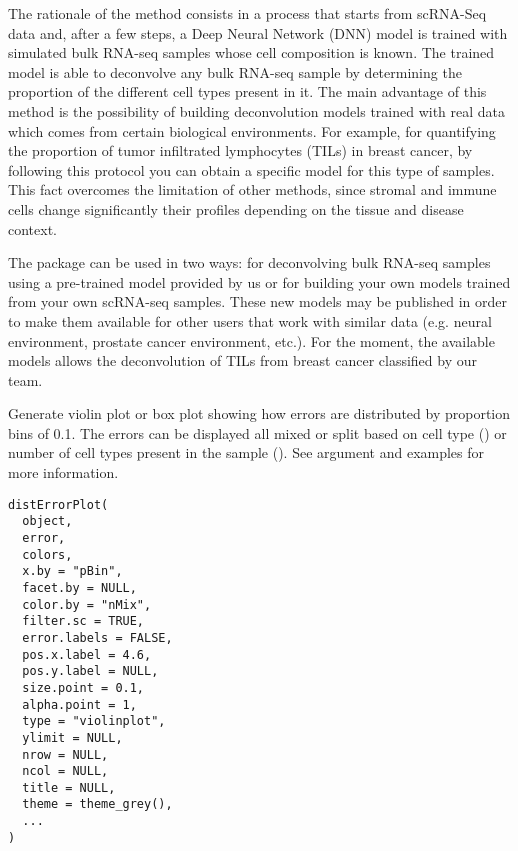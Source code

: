 \documentclass[a4paper]{book}
\begin{document}
\begin{Details}\relax
The rationale of the method consists in a process that starts from scRNA-Seq
data and, after a few steps, a Deep Neural Network (DNN) model is trained
with simulated bulk RNA-seq samples whose cell composition is known. The
trained model is able to deconvolve any bulk RNA-seq sample by determining
the proportion of the different cell types present in it. The main advantage
of this method is the possibility of building deconvolution models trained
with real data which comes from certain biological environments. For example,
for quantifying the proportion of tumor infiltrated lymphocytes (TILs) in
breast cancer, by following this protocol you can obtain a specific model for
this type of samples. This fact overcomes the limitation of other methods,
since stromal and immune cells change significantly their profiles depending
on the tissue and disease context.

The package can be used in two ways: for deconvolving bulk RNA-seq samples
using a pre-trained model provided by us or for building your own models
trained from your own scRNA-seq samples. These new models may be published in
order to make them available for other users that work with similar data
(e.g. neural environment, prostate cancer environment, etc.). For the moment,
the available models allows the deconvolution of TILs from breast cancer
classified by our team.
\end{Details}
%
\begin{Description}\relax
Generate violin plot or box plot showing how errors are distributed by
proportion bins of 0.1. The errors can be displayed all mixed or split based
on cell type () or number of cell types present in the sample
(). See  argument and examples for more
information.
\end{Description}
%
\begin{Usage}
\begin{verbatim}
distErrorPlot(
  object,
  error,
  colors,
  x.by = "pBin",
  facet.by = NULL,
  color.by = "nMix",
  filter.sc = TRUE,
  error.labels = FALSE,
  pos.x.label = 4.6,
  pos.y.label = NULL,
  size.point = 0.1,
  alpha.point = 1,
  type = "violinplot",
  ylimit = NULL,
  nrow = NULL,
  ncol = NULL,
  title = NULL,
  theme = theme_grey(),
  ...
)
\end{verbatim}
\end{Usage}
\end{document}
